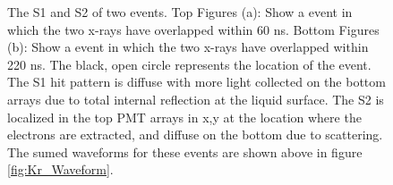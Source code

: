 \renewcommand{\baselinestretch}{1}
\small\normalsize
\begin{figure}[h!]\centering
 

\caption{The S1 and S2 of two \KrCal events. Top Figures (a): Show a \KrCal event in which the two x-rays have overlapped within 60 ns. Bottom Figures (b): Show a \KrCal event in which the two x-rays have overlapped within 220 ns. The black, open circle represents the location of the event. The S1 hit pattern is diffuse with more light collected on the bottom arrays due to total internal reflection at the liquid surface. The S2 is localized in the top PMT arrays in x,y at the location where the electrons are extracted, and diffuse on the bottom due to scattering. The sumed waveforms for these events are shown above in figure \ref{fig:Kr_Waveform}.}
\label{fig:Kr_Hit_Map}
\end{figure}
\renewcommand{\baselinestretch}{2}
\small\normalsize

